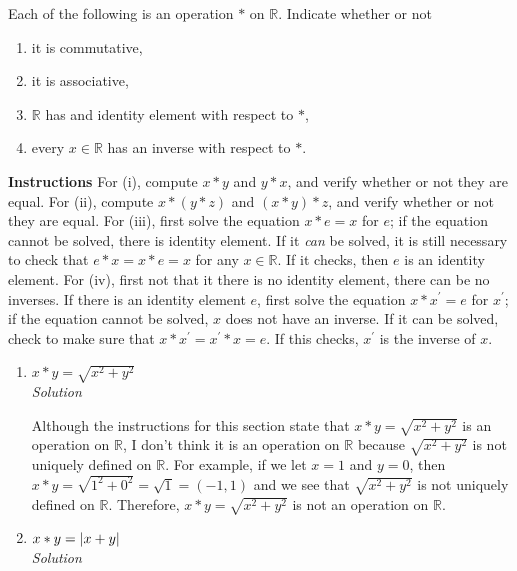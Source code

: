 \documentclass[12pt]{article}
\DeclarePairedDelimiter{\abs}{\lvert}{\rvert}
\begin{document}
\begin{flushleft}
Each of the following is an operation $*$ on $\mathbb{R}$. Indicate whether or not

\renewcommand{\theenumi}{(\roman{enumi})}
\begin{enumerate}
  \item it is commutative,
  \item it is associative,
  \item $\mathbb{R}$ has and identity element with respect to $*$,
  \item every $x \in \mathbb{R}$ has an inverse with respect to $*$.
\end{enumerate}

\textbf{Instructions} For (i), compute $x * y$ and $y * x$, and verify whether or not they are equal. For (ii), compute $x * (y * z)$ and $(x * y) * z$, and verify whether or not they are equal. For (iii), first solve the equation $x * e = x$ for $e$; if the equation cannot be solved, there is identity element. If it \textit{can} be solved, it is still necessary to check that $e * x = x * e = x$ for any $x \in \mathbb{R}$. If it checks, then $e$ is an identity element. For (iv), first not that it there is no identity element, there can be no inverses. If there is an identity element $e$, first solve the equation $x * x^{'} = e$ for $x^{'}$; if the equation cannot be solved, $x$ does not have an inverse. If it can be solved, check to make sure that $x * x^{'} = x^{'} * x = e$. If this checks, $x^{'}$ is the inverse of $x$.


\renewcommand{\theenumi}{\arabic{enumi})}
\begin{enumerate}



\item $x * y = \sqrt{x^2 + y^2}$ \\
	\medskip
	\textit{Solution}

	Although the instructions for this section state that $x * y = \sqrt{x^2 + y^2}$ is an operation on $\mathbb{R}$, I don't think it is an operation on  $\mathbb{R}$ because $\sqrt{x^2 + y^2}$ is not uniquely defined on $\mathbb{R}$. For example, if we let $x = 1$ and $y = 0$, then $x * y = \sqrt{1^2 + 0^2} = \sqrt{1} = (-1, 1)$ and we see that $\sqrt{x^2 + y^2}$ is not uniquely defined on $\mathbb{R}$. Therefore, $x * y = \sqrt{x^2 + y^2}$ is not an operation on $\mathbb{R}$. \\

\item $x * y = \abs{ x + y }$ \\
	\medskip
	\textit{Solution}
	\medskip


\end{enumerate}
\end{flushleft}
\end{document}
